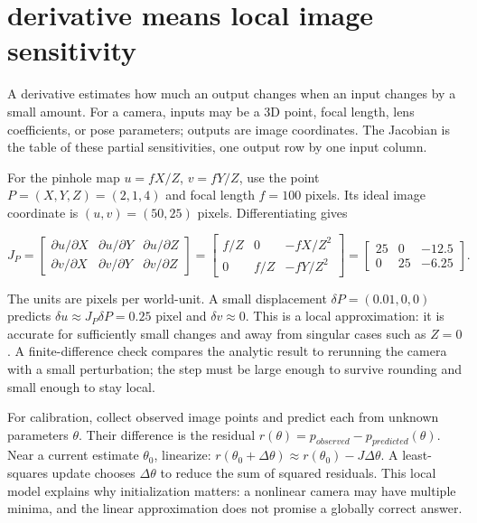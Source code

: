 \section{derivative means local image sensitivity}\label{02-foundations-ii-ch034-derivative-means-local-image-sensitivity}

A derivative estimates how much an output changes when an input changes by a small amount. For a camera, inputs may be a 3D point, focal length, lens coefficients, or pose parameters; outputs are image coordinates. The Jacobian is the table of these partial sensitivities, one output row by one input column.

For the pinhole map \(u=fX/Z\), \(v=fY/Z\), use the point \(P=(X,Y,Z)=(2,1,4)\) and focal length \(f=100\) pixels. Its ideal image coordinate is \((u,v)=(50,25)\) pixels. Differentiating gives

\[
J_P=\begin{bmatrix}
\partial u/\partial X&\partial u/\partial Y&\partial u/\partial Z\\
\partial v/\partial X&\partial v/\partial Y&\partial v/\partial Z
\end{bmatrix}
=\begin{bmatrix}f/Z&0&-fX/Z^2\\0&f/Z&-fY/Z^2\end{bmatrix}
=\begin{bmatrix}25&0&-12.5\\0&25&-6.25\end{bmatrix}.
\]

The units are pixels per world-unit. A small displacement \(\delta P=(0.01,0,0)\) predicts \(\delta u\approx J_P\delta P=0.25\) pixel and \(\delta v\approx0\). This is a local approximation: it is accurate for sufficiently small changes and away from singular cases such as \(Z=0\). A finite-difference check compares the analytic result to rerunning the camera with a small perturbation; the step must be large enough to survive rounding and small enough to stay local.

For calibration, collect observed image points and predict each from unknown parameters \(\theta\). Their difference is the residual \(r(\theta)=p_{observed}-p_{predicted}(\theta)\). Near a current estimate \(\theta_0\), linearize: \(r(\theta_0+\Delta\theta)\approx r(\theta_0)-J\Delta\theta\). A least-squares update chooses \(\Delta\theta\) to reduce the sum of squared residuals. This local model explains why initialization matters: a nonlinear camera may have multiple minima, and the linear approximation does not promise a globally correct answer.

